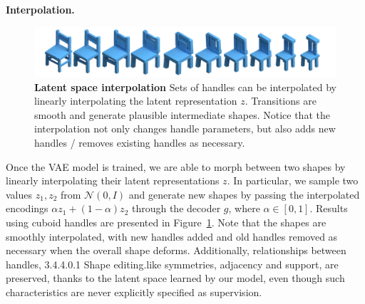 \vspace{5pt}
\noindent\textbf{Interpolation.}
\begin{figure}
\centering
\includegraphics[width=1.0\linewidth]{handles/imgs/interpolation.png}
\vspace{-20pt}
\caption{\label{fig:interp} \small
\textbf{Latent space interpolation}
Sets of handles can be interpolated by linearly interpolating
the latent representation $z$.
Transitions are smooth and generate plausible intermediate shapes.
Notice that the interpolation not only changes handle parameters, but also
adds new handles / removes existing handles as necessary.
}
\vspace{-15pt}
\end{figure}
Once the VAE model is trained, we are able to morph between two shapes by 
linearly interpolating their latent representations $z$.
In particular, we sample two values $z_1, z_2$ from $\mathcal{N}(0, I)$ and generate new shapes by passing the interpolated encodings $\alpha z_1 + (1-\alpha) z_2$ through the decoder $g$,
where $\alpha \in [0, 1]$.
Results using cuboid handles are presented in Figure~\ref{fig:interp}.
Note that the shapes are smoothly interpolated, with new handles added and old handles removed as necessary when the overall shape deforms.
Additionally, relationships between handles, 3.4.4.0.1    Shape editing.like symmetries, adjacency and support, are
preserved, thanks to the latent space learned by our model, even though such characteristics are never explicitly specified as supervision.

